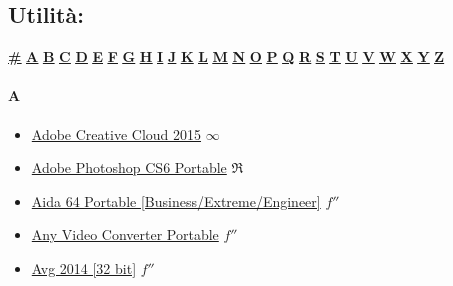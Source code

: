 \subsection [Utilità]{\huge Utilità:}
	\begin{center}
		\hyperlink{U\#}{\textbf{\underline{\#}}}
		\hyperlink{UA}{\textbf{\underline{A}}} \hyperlink{UB}{\textbf{\underline{B}}} \hyperlink{UC}{\textbf{\underline{C}}} \hyperlink{UD}{\textbf{\underline{D}}} \hyperlink{UE}{\textbf{\underline{E}}} \hyperlink{UF}{\textbf{\underline{F}}} \hyperlink{UG}{\textbf{\underline{G}}} \hyperlink{UH}{\textbf{\underline{H}}} \hyperlink{UI}{\textbf{\underline{I}}} \hyperlink{UJ}{\textbf{\underline{J}}} \hyperlink{UK}{\textbf{\underline{K}}} \hyperlink{UL}{\textbf{\underline{L}}} \hyperlink{UM}{\textbf{\underline{M}}} \hyperlink{UN}{\textbf{\underline{N}}} \hyperlink{UO}{\textbf{\underline{O}}} \hyperlink{UP}{\textbf{\underline{P}}} \hyperlink{UQ}{\textbf{\underline{Q}}} \hyperlink{UR}{\textbf{\underline{R}}} \hyperlink{US}{\textbf{\underline{S}}} \hyperlink{UT}{\textbf{\underline{T}}} \hyperlink{UU}{\textbf{\underline{U}}} \hyperlink{UV}{\textbf{\underline{V}}} \hyperlink{UW}{\textbf{\underline{W}}} \hyperlink{UX}{\textbf{\underline{X}}} 
		\hyperlink{UY}{\textbf{\underline{Y}}} \hyperlink{UZ}{\textbf{\underline{Z}}}
	\end{center}

	\paragraph{A} \hypertarget{UA}{}
		\begin{itemize}
			\item \href{https://mega.nz/#!dXJ32QRA!yKy-ZEtc7A0etzD1ldQSNjN3UWjolZwt-UkUzVwbAzM} {Adobe Creative Cloud 2015} $\infty$ \\		
			\item \href{https://mega.nz/#!aDBCxA7I!ulKrhKGUiV8-s7GNSXtZu6f2qQvnP-S6WXtLuu3_P7c} {Adobe Photoshop CS6 Portable} $\Re$ \\
			\item \href{https://mega.nz/#!TKZCgawR!rVAkAKsF2WKZHVjv2AU63WcGLIfRmvd1sZF7RztdBoU} {Aida 64 Portable [Business/Extreme/Engineer]} $f''$ \\
			\item \href{https://mega.nz/#!zbQi0Yqb!F-t9Tita6cRkquaPWKd6AnltgI_yoIcoUx_39onirUI} {Any Video Converter Portable} $f''$ \\
			\item \href{https://mega.nz/#!yDYmFBzD!N5gJ8NtCI-rJEj1u2z1AzfS-s0yV4p3cUlE_B6eBtzg} {Avg 2014 [32 bit]} $f''$ \\
			
		\end{itemize}
	
